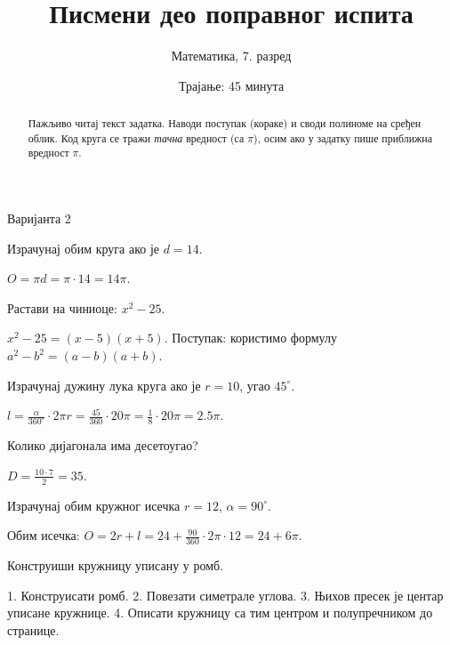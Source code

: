 \documentclass[11pt,a5paper,twoside,addpoints,noanswers]{exam}
\title{Писмени део поправног испита}
\author{Математика, 7. разред}
\date{Трајање: 45 минута}
\newcommand{\variant}[1]{#1}
\begin{document}
\maketitle

\ifprintanswers\else
\begin{flushleft}\scriptsize
\gradetable[h]
\end{flushleft}
\begin{abstract}\small
Пажљиво читај текст задатка. Наводи поступак (кораке) и своди полиноме на сређен облик.  
Код круга се тражи \emph{тачна} вредност (са $\pi$), осим ако у задатку пише приближна вредност $\pi$.
\end{abstract}
\fi

\ifprintanswers\else
\newpage
\fi

\variant{Варијанта 2}

\begin{questions}

\question[3] Израчунај обим круга ако је $d=14$.
\begin{solution}[\stretch{2}]
$O=\pi d=\pi\cdot 14=14\pi$.  
\end{solution}

\question[4] Растави на чиниоце: $x^2-25$.
\begin{solution}[\stretch{2}]
$x^2-25=(x-5)(x+5)$.  
Поступак: користимо формулу $a^2-b^2=(a-b)(a+b)$.  
\end{solution}

\question[4] Израчунај дужину лука круга ако је $r=10$, угао $45^\circ$.
\begin{solution}[\stretch{3}]
$l=\frac{\alpha}{360^\circ}\cdot 2\pi r=\frac{45}{360}\cdot 20\pi=\tfrac{1}{8}\cdot 20\pi=2.5\pi$.  
\end{solution}

\question[4] Колико дијагонала има десетоугао?
\begin{solution}[\stretch{2}]
$D=\tfrac{10\cdot 7}{2}=35$.  
\end{solution}

\question[3] Израчунај обим кружног исечка $r=12$, $\alpha=90^\circ$.
\begin{solution}[\stretch{3}]
Обим исечка: $O=2r+l=24+ \frac{90}{360}\cdot 2\pi\cdot 12=24+6\pi$.  
\end{solution}

\question[4] Конструиши кружницу уписану у ромб.
\begin{solution}[\stretch{4}]
1. Конструисати ромб.  
2. Повезати симетрале углова.  
3. Њихов пресек је центар уписане кружнице.  
4. Описати кружницу са тим центром и полупречником до странице.  
\end{solution}

\end{questions}
\end{document}
